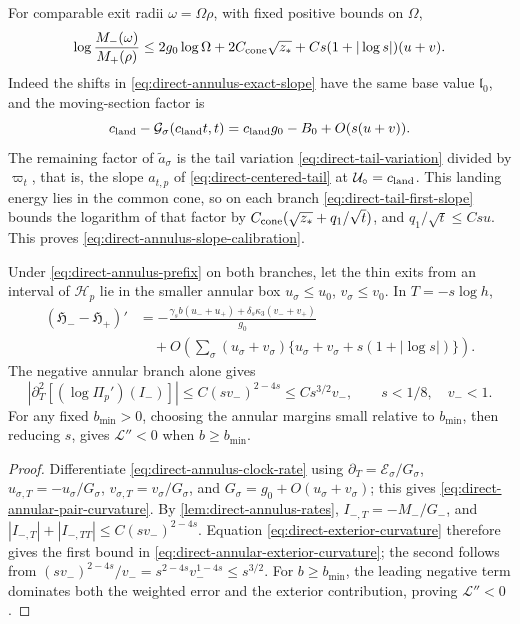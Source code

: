 For comparable exit radii \(\omega=\Omega\rho\), with
fixed positive bounds on \(\Omega\),
\begin{equation}
\label{eq:direct-annulus-slope-calibration}
 \log\frac{M_-(\omega)}{M_+(\rho)}
 \le 2g_0\log\Omega+2C_{\rm cone}\sqrt{z_*}
               +Cs(1+|\log s|)(u+v).
\end{equation}
Indeed the shifts in \eqref{eq:direct-annulus-exact-slope}
have the same base value \(\mathfrak l_0\), and the moving-section
factor is
\[
 c_{\rm land}-\mathcal G_\sigma(c_{\rm land}t,t)
       =c_{\rm land}g_0-B_0+O(s(u+v)).
\]
The remaining factor of \(\tilde a_\sigma\) is the tail variation
\eqref{eq:direct-tail-variation} divided by \(\varpi_t\), that is, the slope
\(a_{t,p}\) of \eqref{eq:direct-centered-tail} at \(\mathcal U_\circ=c_{\rm land}\).
This landing energy lies in the common cone, so on each branch
\eqref{eq:direct-tail-first-slope} bounds the logarithm of that factor by
\(C_{\rm cone}(\sqrt{z_*}+q_1/\sqrt t)\), and \(q_1/\sqrt t\le Csu\). This
proves \eqref{eq:direct-annulus-slope-calibration}.

\begin{corollary}
\label{cor:direct-annular-pair}
Under \eqref{eq:direct-annulus-prefix} on both branches, let the thin
exits from an interval of \(\mathcal H_p\) lie in the smaller annular box
\(u_\sigma\le u_0\), \(v_\sigma\le v_0\). In \(T=-s\log h\),
\begin{equation}
\label{eq:direct-annular-pair-curvature}
 \begin{split}
 (\mathfrak H_--\mathfrak H_+)'&=
 -\frac{\gamma_sb(u_-+u_+)+\delta_s\kappa_3(v_-+v_+)}{g_0}\\
 &\quad+O\left(\sum_\sigma(u_\sigma+v_\sigma)
       \{u_\sigma+v_\sigma+s(1+|\log s|)\}\right).
 \end{split}
\end{equation}
The negative annular branch alone gives
\begin{equation}
\label{eq:direct-annular-exterior-curvature}
 |\partial_T^2[(\log\Pi_p')(I_-)]|\le C(sv_-)^{2-4s}
                    \le Cs^{3/2}v_-,\qquad s<1/8,\quad v_-<1.
\end{equation}
For any fixed \(b_{\min}>0\), choosing the annular margins small relative to
\(b_{\min}\), then reducing \(s\), gives \(\mathcal L''<0\) when \(b\ge b_{\min}\).
\end{corollary}

\begin{proof}
Differentiate \eqref{eq:direct-annulus-clock-rate} using
\(\partial_T=\mathcal E_\sigma/G_\sigma\),
\(u_{\sigma,T}=-u_\sigma/G_\sigma\), \(v_{\sigma,T}=v_\sigma/G_\sigma\),
and \(G_\sigma=g_0+O(u_\sigma+v_\sigma)\); this gives
\eqref{eq:direct-annular-pair-curvature}.
By \cref{lem:direct-annulus-rates}, \(I_{-,T}=-M_-/G_-\), and
\(|I_{-,T}|+|I_{-,TT}|\le C(sv_-)^{2-4s}\).
Equation \eqref{eq:direct-exterior-curvature} therefore gives the first
bound in \eqref{eq:direct-annular-exterior-curvature}; the second follows
from \((sv_-)^{2-4s}/v_-=s^{2-4s}v_-^{1-4s}\le s^{3/2}\).
For \(b\ge b_{\min}\), the leading negative term dominates both the weighted
error and the exterior contribution, proving \(\mathcal L''<0\).
\end{proof}

